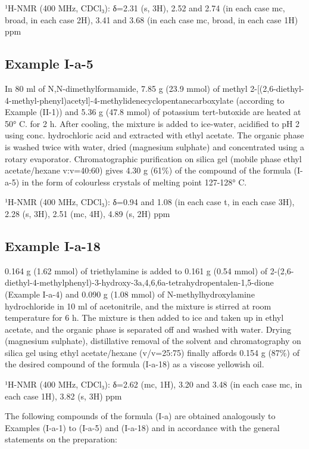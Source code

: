 \documentclass[11pt,a4paper]{article}
\begin{document}
¹H-NMR (400 MHz, CDCl₃): δ=2.31 (s, 3H), 2.52 and 2.74 (in each case mc, broad, in each case 2H), 3.41 and 3.68 (in each case mc, broad, in each case 1H) ppm

\subsection{Example I-a-5}

In 80 ml of N,N-dimethylformamide, 7.85 g (23.9 mmol) of methyl 2-[(2,6-diethyl-4-methyl-phenyl)acetyl]-4-methylidenecyclopentanecarboxylate (according to Example (II-1)) and 5.36 g (47.8 mmol) of potassium tert-butoxide are heated at 50° C. for 2 h. After cooling, the mixture is added to ice-water, acidified to pH 2 using conc. hydrochloric acid and extracted with ethyl acetate. The organic phase is washed twice with water, dried (magnesium sulphate) and concentrated using a rotary evaporator. Chromatographic purification on silica gel (mobile phase ethyl acetate/hexane v:v=40:60) gives 4.30 g (61\%) of the compound of the formula (I-a-5) in the form of colourless crystals of melting point 127-128° C.

¹H-NMR (400 MHz, CDCl₃): δ=0.94 and 1.08 (in each case t, in each case 3H), 2.28 (s, 3H), 2.51 (mc, 4H), 4.89 (s, 2H) ppm

\subsection{Example I-a-18}

0.164 g (1.62 mmol) of triethylamine is added to 0.161 g (0.54 mmol) of 2-(2,6-diethyl-4-methylphenyl)-3-hydroxy-3a,4,6,6a-tetrahydropentalen-1,5-dione (Example I-a-4) and 0.090 g (1.08 mmol) of N-methylhydroxylamine hydrochloride in 10 ml of acetonitrile, and the mixture is stirred at room temperature for 6 h. The mixture is then added to ice and taken up in ethyl acetate, and the organic phase is separated off and washed with water. Drying (magnesium sulphate), distillative removal of the solvent and chromatography on silica gel using ethyl acetate/hexane (v/v=25:75) finally affords 0.154 g (87\%) of the desired compound of the formula (I-a-18) as a viscose yellowish oil.

¹H-NMR (400 MHz, CDCl₃): δ=2.62 (mc, 1H), 3.20 and 3.48 (in each case mc, in each case 1H), 3.82 (s, 3H) ppm

The following compounds of the formula (I-a) are obtained analogously to Examples (I-a-1) to (I-a-5) and (I-a-18) and in accordance with the general statements on the preparation:
\end{document}

